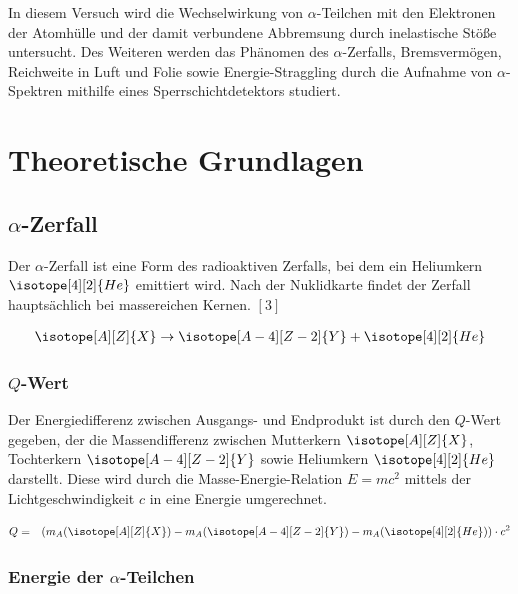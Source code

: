 \documentclass[12pt,a4paper]{scrartcl}
\numberwithin{equation}{section} %
\renewcommand{\[}{} %
\renewcommand{\]}{\noindent} %
\begin{document}
In diesem Versuch wird die Wechselwirkung von \(\alpha\)-Teilchen mit
den Elektronen der Atomhülle und der damit verbundene Abbremsung durch
inelastische Stöße untersucht. Des Weiteren werden das Phänomen des
\(\alpha\)-Zerfalls, Bremsvermögen, Reichweite in Luft und Folie sowie
Energie-Straggling durch die Aufnahme von \(\alpha\)-Spektren mithilfe
eines Sperrschichtdetektors studiert.

\hypertarget{theoretische-grundlagen}{%
\section{Theoretische Grundlagen}\label{theoretische-grundlagen}}

\hypertarget{alpha-zerfall}{%
\subsection{\texorpdfstring{\(\alpha\)-Zerfall}{\textbackslash alpha-Zerfall}}\label{alpha-zerfall}}

Der \(\alpha\)-Zerfall ist eine Form des radioaktiven Zerfalls, bei dem
ein Heliumkern \(\isotope[4][2]{He}\) emittiert wird. Nach der
Nuklidkarte findet der Zerfall hauptsächlich bei massereichen Kernen.
\([3]\)

\[
\begin{eqnarray}
    \isotope[A][Z]{X} \to \isotope[A-4][Z-2]{Y} + \isotope[4][2]{He}
\end{eqnarray}
\]

\hypertarget{q-wert}{%
\subsubsection{\texorpdfstring{\(Q\)-Wert}{Q-Wert}}\label{q-wert}}

Der Energiedifferenz zwischen Ausgangs- und Endprodukt ist durch den
\(Q\)-Wert gegeben, der die Massendifferenz zwischen Mutterkern
\(\isotope[A][Z]{X}\), Tochterkern \(\isotope[A-4][Z-2]{Y}\) sowie
Heliumkern \(\isotope[4][2]{He}\) darstellt. Diese wird durch die
Masse-Energie-Relation \(E=mc^2\) mittels der Lichtgeschwindigkeit \(c\)
in eine Energie umgerechnet.

\[
\begin{eqnarray}
    Q &=& (m_{A}(\isotope[A][Z]{X}) - m_{A}(\isotope[A-4][Z-2]{Y}) - m_{A}(\isotope [4][2]{He})) \cdot c^2
\end{eqnarray}
\]

\hypertarget{energie-der-alpha-teilchen}{%
\subsubsection{\texorpdfstring{Energie der
\(\alpha\)-Teilchen}{Energie der \textbackslash alpha-Teilchen}}\label{energie-der-alpha-teilchen}}
\end{document}
